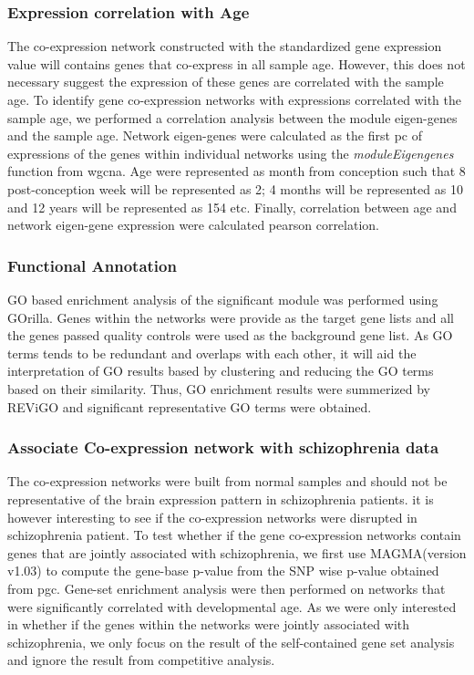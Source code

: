 \subsubsection{Expression correlation with Age}
The co-expression network constructed with the standardized gene expression value will contains genes that co-express in all sample age.
However, this does not necessary suggest the expression of these genes are correlated with the sample age.
To identify gene co-expression networks with expressions correlated with the sample age, we performed a correlation analysis between the module eigen-genes and the sample age. 
Network eigen-genes were calculated as the first \gls{pc} of expressions of the genes within individual networks using the \emph{moduleEigengenes} function from \gls{wgcna}. 
Age were represented as month from conception such that 8 post-conception week will be represented as 2; 4 months will be represented as 10 and 12 years will be represented as 154 etc. 
Finally, correlation between age and network eigen-gene expression were calculated pearson correlation.

\subsubsection{Functional Annotation}
\gls{GO} based enrichment analysis of the significant module was performed using GOrilla\citep{Eden2009}.
Genes within the networks were provide as the target gene lists and all the genes passed quality controls were used as the background gene list.
As \gls{GO} terms tends to be redundant and overlaps with each other, it will aid the interpretation of \gls{GO} results based by clustering and reducing the \gls{GO} terms based on their similarity. 
Thus, \gls{GO} enrichment results were summerized by REViGO\citep{Supek2011} and significant representative \gls{GO} terms were obtained.

\subsubsection{Associate Co-expression network with  schizophrenia data}
The co-expression networks were built from normal samples and should not be representative of the brain expression pattern in schizophrenia patients.
it is however interesting to see if the co-expression networks were disrupted in schizophrenia patient.
To test whether if the gene co-expression networks contain genes that are jointly associated with schizophrenia, we first use \gls{MAGMA}\citep{DeLeeuw2015}(version v1.03) to compute the gene-base p-value from the \gls{SNP} wise p-value obtained from \gls{pgc}. 
Gene-set enrichment analysis were then performed on networks that were significantly correlated with developmental age. 
As we were only interested in whether if the genes within the networks were jointly associated with schizophrenia, we only focus on the result of the self-contained gene set analysis and ignore the result from competitive analysis.

